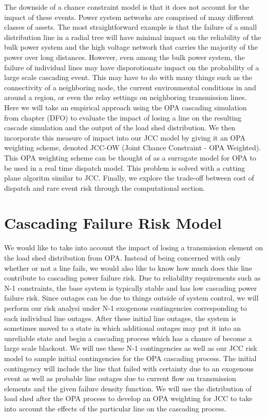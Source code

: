 The downside of a chance constraint model is that it does not account for the impact of these events.  Power system networks are comprised of many different classes of assets.  The most straightforward example is that the failure of a small distribution line in a radial tree will have minimal impact on the reliability of the bulk power system and the high voltage network that carries the majority of the power over long distances.  However, even among the bulk power system, the failure of individual lines may have disporotionate impact on the probability of a large scale cascading event.  This may have to do with many things such as the connectivity of a neighboring node, the current environmental conditions in and around a region, or even the relay settings on neighboring transmission lines.  Here we will take an empirical approach using the OPA cascading simulation from chapter (DFO) to evaluate the impact of losing a line on the resulting cascade simulation and the output of the load shed distribution.  We then incorporate this measure of impact into our JCC model by giving it an OPA weighting scheme, denoted JCC-OW (Joint Chance Constraint - OPA Weighted).  This OPA weighting scheme can be thought of as a surragate model for OPA to be used in a real time dispatch model.  This problem is solved with a cutting plane algoritm similar to JCC.  Finally, we explore the trade-off between cost of dispatch and rare event risk through the computational section.


\section{Cascading Failure Risk Model}
We would like to take into account the impact of losing a transmission element on the load shed distribution from OPA.  Instead of being concerned with only whether or not a line fails, we would also like to know how much does this line contribute to cascading power failure risk.  Due to reliability requirements such as N-1 constraints, the base system is typically stable and has low cascading power failure risk.  Since outages can be due to things outside of system control, we will perform our risk analysi under N-1 exogenous contingencies corresponding to each individual line outages.  After these initial line outages, the system is sometimes moved to a state in which additional outages may put it into an unreliable state and begin a cascading process which has a chance of become a large scale blackout.  We will use these N-1 contingencies as well as our JCC risk model to sample initial contingencies for the OPA cascading process.  The initial contingency will include the line that failed with certainty due to an exogenous event as well as probable line outages due to current flow on transmission elements and the given failure density function.  We will use the distribution of load shed after the OPA process to develop an OPA weighting for JCC to take into account the effects of the particular line on the cascading process. 

